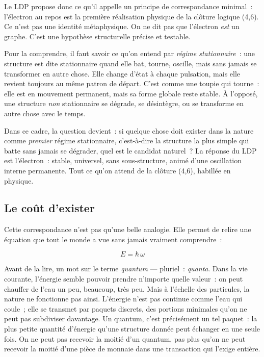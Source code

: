 \documentclass[12pt, a4paper, openright]{book}
\begin{document}
\medskip

Le LDP propose donc ce qu'il appelle un principe de correspondance minimal~: l'électron au repos est la première réalisation physique de la clôture logique (4,6). Ce n'est pas une identité métaphysique. On ne dit pas que l'électron \emph{est} un graphe. C'est une hypothèse structurelle précise et testable.

\medskip

Pour la comprendre, il faut savoir ce qu'on entend par \emph{régime stationnaire}~: une structure est dite stationnaire quand elle bat, tourne, oscille, mais sans jamais se transformer en autre chose. Elle change d'état à chaque pulsation, mais elle revient toujours au même patron de départ. C'est comme une toupie qui tourne~: elle est en mouvement permanent, mais sa forme globale reste stable. À l'opposé, une structure \emph{non} stationnaire se dégrade, se désintègre, ou se transforme en autre chose avec le temps.

\medskip

Dans ce cadre, la question devient~: si quelque chose doit exister dans la nature comme \emph{premier} régime stationnaire, c'est-à-dire la structure la plus simple qui batte sans jamais se dégrader, quel est le candidat naturel~? La réponse du LDP est l'électron~: stable, universel, sans sous-structure, animé d'une oscillation interne permanente. Tout ce qu'on attend de la clôture (4,6), habillée en physique.

\subsection*{Le coût d'exister}

Cette correspondance n'est pas qu'une belle analogie. Elle permet de relire une équation que tout le monde a vue sans jamais vraiment comprendre~:

\begin{equation}
E = \hbar\,\omega
\end{equation}

Avant de la lire, un mot sur le terme \emph{quantum} — pluriel~: \emph{quanta}. Dans la vie courante, l'énergie semble pouvoir prendre n'importe quelle valeur~: on peut chauffer de l'eau un peu, beaucoup, très peu. Mais à l'échelle des particules, la nature ne fonctionne pas ainsi. L'énergie n'est pas continue comme l'eau qui coule~; elle se transmet par paquets discrets, des portions minimales qu'on ne peut pas subdiviser davantage. Un quantum, c'est précisément un tel paquet~: la plus petite quantité d'énergie qu'une structure donnée peut échanger en une seule fois. On ne peut pas recevoir la moitié d'un quantum, pas plus qu'on ne peut recevoir la moitié d'une pièce de monnaie dans une transaction qui l'exige entière.
\end{document}
